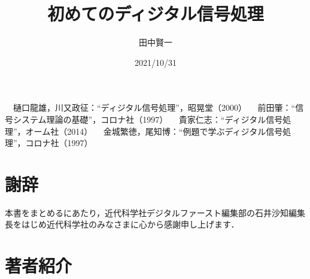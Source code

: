 \documentclass[dvipdfmx,%
  tombo,%
  paper=b5,%
]{kddbook}
\title{初めてのディジタル信号処理}
\author{田中賢一}
\date{2021/10/31}
\begin{document}
\frontmatter



\tableofcontents

\mainmatter










%





\clearpage

\clearpage


\begin{thebibliography}{99}


	　樋口龍雄，川又政征：``ディジタル信号処理''，昭晃堂（2000）
	　前田肇：``信号システム理論の基礎''，コロナ社（1997）
	　貴家仁志：``ディジタル信号処理''，オーム社（2014）
	　金城繁徳，尾知博：``例題で学ぶディジタル信号処理''，コロナ社（1997）
\end{thebibliography}

\backmatter
\chapter{謝辞}

本書をまとめるにあたり，近代科学社デジタルファースト編集部の石井沙知編集長をはじめ近代科学社のみなさまに心から感謝申し上げます．

\chapter{著者紹介}
\end{document}
